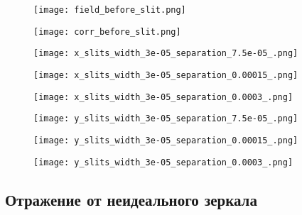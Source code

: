 \begin{figure}[H]
	\centering
	\begin{minipage}{0.33\textwidth}
		\centering
		\texttt{[image: field\_before\_slit.png]}
		\caption{}
		\label{fig:2-beam_size_k}
	\end{minipage}
	\begin{minipage}{0.33\textwidth}
		\centering
		\texttt{[image: corr\_before\_slit.png]}
		\caption{}
		\label{fig:2-beam_size_s}
	\end{minipage}\hfill
\end{figure}

\begin{figure}[H]
	\centering
	\begin{minipage}{0.33\textwidth}
		\centering
		\texttt{[image: x\_slits\_width\_3e-05\_separation\_7.5e-05\_.png]}
		\caption{}
		\label{fig:2-beam_size_k}
	\end{minipage}
	\begin{minipage}{0.33\textwidth}
		\centering
		\texttt{[image: x\_slits\_width\_3e-05\_separation\_0.00015\_.png]}
		\caption{}
		\label{fig:2-beam_size_s}
	\end{minipage}\hfill
	\begin{minipage}{0.33\textwidth}
		\centering
		\texttt{[image: x\_slits\_width\_3e-05\_separation\_0.0003\_.png]}
		\caption{}
		\label{fig:2-beam_size_s}
	\end{minipage}\hfill
\end{figure}

\begin{figure}[H]
	\centering
	\begin{minipage}{0.33\textwidth}
		\centering
		\texttt{[image: y\_slits\_width\_3e-05\_separation\_7.5e-05\_.png]}
		\caption{}
		\label{fig:2-beam_size_k}
	\end{minipage}
	\begin{minipage}{0.33\textwidth}
		\centering
		\texttt{[image: y\_slits\_width\_3e-05\_separation\_0.00015\_.png]}
		\caption{}
		\label{fig:2-beam_size_s}
	\end{minipage}\hfill
	\begin{minipage}{0.33\textwidth}
		\centering
		\texttt{[image: y\_slits\_width\_3e-05\_separation\_0.0003\_.png]}
		\caption{}
		\label{fig:2-beam_size_s}
\end{minipage}\hfill
\end{figure}


\subsection{Отражение от неидеального зеркала}






